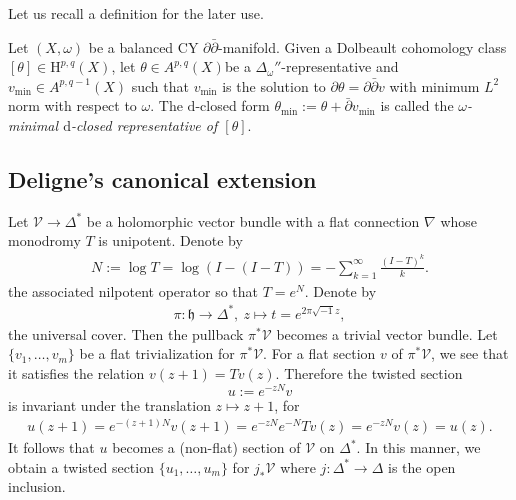 Let us recall a definition for the later use.
\begin{definition}
Let \((X,\omega)\) be a balanced CY \(\partial\bar{\partial}\)-manifold.
Given a Dolbeault cohomology class \([\theta]\in\mathrm{H}^{p,q}(X)\), 
let \(\theta\in A^{p,q}(X)\)be a \(\Delta_{\omega}''\)-representative
and \(v_{\mathrm{min}}\in A^{p,q-1}(X)\) such that \(v_{\mathrm{min}}\)
is the solution to
\(\partial\theta=\partial\bar{\partial}v\) with minimum \(L^{2}\) norm
with respect to \(\omega\). The \(\mathrm{d}\)-closed form
\(\theta_{\mathrm{min}}:=\theta+\bar{\partial}v_{\mathrm{min}}\)
is called the \emph{\(\omega\)-minimal \(\mathrm{d}\)-closed
representative of \([\theta]\)}.
\end{definition}



\subsection{Deligne's canonical extension}
\label{subsec:deligne-ext}
Let \(\mathcal{V}\to \Delta^{\ast}\) be a holomorphic vector bundle with a flat connection \(\nabla\) whose monodromy \(T\) is unipotent. 
Denote by 
\begin{eqnarray*}
N:=\log T=\log (I-(I-T))=-\sum_{k=1}^{\infty}\frac{(I-T)^{k}}{k}.
\end{eqnarray*} 
the associated nilpotent operator so that \(T=e^{N}\).
Denote by 
\begin{eqnarray*}
\pi\colon \mathfrak{h}\to\Delta^{\ast},~z\mapsto t=e^{2\pi\sqrt{-1}z}, 
\end{eqnarray*}
the universal cover.
Then the pullback \(\pi^{\ast}\mathcal{V}\) becomes a trivial vector bundle.
Let \(\{v_{1},\ldots,v_{m}\}\) be a flat trivialization for \(\pi^{\ast}\mathcal{V}\).
For a flat section \(v\) of \(\mathcal{\pi^{\ast}V}\), we see that it satisfies the relation
\(v(z+1) = Tv(z)\). Therefore
the twisted section
\begin{equation*}
u:=e^{-zN} v
\end{equation*}
is invariant under the translation \(z\mapsto z+1\), for
\begin{eqnarray*}
u(z+1) = e^{-(z+1)N} v(z+1) = e^{-zN} e^{-N} Tv(z) = e^{-zN}v(z) = u(z).
\end{eqnarray*}
It follows that \(u\) becomes a (non-flat) section of \(\mathcal{V}\) on \(\Delta^{\ast}\).
In this manner, we obtain a twisted section \(\{u_{1},\ldots,u_{m}\}\)
for \(j_{\ast}\mathcal{V}\) where \(j\colon\Delta^{\ast}\to\Delta\)
is the open inclusion.
